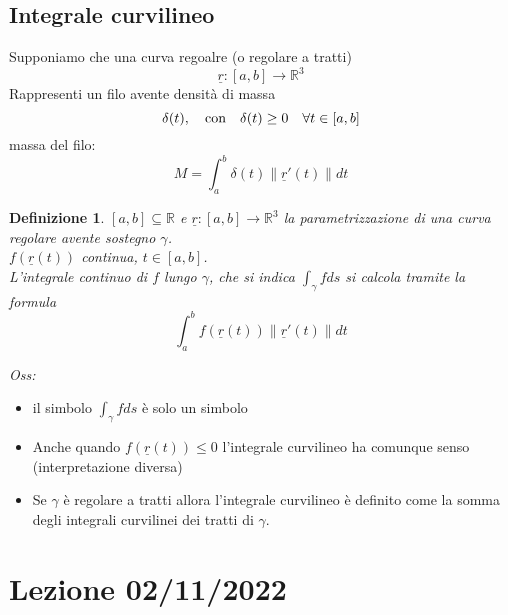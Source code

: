 \documentclass{scrreprt}
\newtheorem{defn}{Definizione}
\newenvironment{definition}{\begin{mdframed}[backgroundcolor=Ivory2]\begin{defn}}{\end{defn}\end{mdframed}}
\begin{document}
\subsection{Integrale curvilineo}
Supponiamo che una curva regoalre (o regolare a tratti)
\begin{equation}
	\underline{r}: [a,b] \rightarrow \mathbb{R}^3
\end{equation}
Rappresenti un filo avente densità di massa
\begin{equation}
	\delta(t), \quad \textnormal{con} \quad \delta(t) \geq 0 \quad \forall t \in [a,b]
\end{equation}
massa del filo:
\begin{equation}
	M = \int_a^b \delta(t) \left\lVert \underline{r}'(t) \right\rVert dt
\end{equation}

\begin{definition}
	$[a,b] \subseteq \mathbb{R}$ e $\underline{r}: [a,b] \rightarrow \mathbb{R}^3$ la parametrizzazione di una curva regolare avente sostegno $\gamma$.\\
	$f(\underline{r}(t))$ continua, $t \in [a,b]$.\\
	L'integrale continuo di $f$ lungo $\gamma$, che si indica
	$ \int_{\gamma} f ds $ si calcola tramite la formula
	\begin{equation}
		\int_{a}^b f(\underline{r}(t)) \left\lVert \underline{r}'(t) \right\rVert dt
	\end{equation}
\end{definition}
\emph{Oss:}
\begin{itemize}
	\item il simbolo $\int_{\gamma} f ds$ è solo un simbolo %
	\item Anche quando $f(\underline{r}(t)) \leq 0$ l'integrale curvilineo ha comunque senso (interpretazione diversa)
	\item Se $\gamma$ è regolare a tratti allora l'integrale curvilineo è definito come la somma degli integrali curvilinei dei tratti di $\gamma$.
\end{itemize}

\section*{Lezione 02/11/2022}
\end{document}

